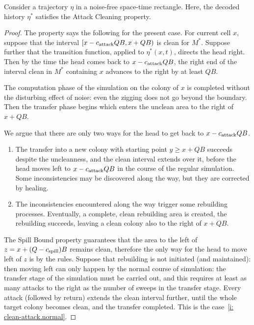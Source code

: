 \documentclass[12pt]{memoir}
\renewcommand{\ge}{\geq}
\def\B{B}
\newcommand{\Q}{Q}
\newcommand{\cns}[1]{c_{\textrm{\upshape #1}}}
\newcommand{\CAtt}{\cns{attack}}
\newcommand{\CSpill}{\cns{spill}}
\begin{document}
\begin{lemma}\label{lem:clean-attack}
Consider a trajectory \( \eta \) in a noise-free space-time rectangle.
Here, the decoded history \( \eta^{*} \) satisfies the Attack Cleaning property.
\end{lemma}
\begin{proof}
The property says the following for the present case.
For current cell \( x \), suppose that the interval
\( \lint{x-\CAtt\Q\B}{x+\Q\B} \) is clean for \( M^{*} \).
Suppose further that the transition function, applied to \( \eta^{*}(x,t) \), directs the head right.
Then by the time the head comes back to \( x-\CAtt\Q\B \), the right end of the interval clean in \( M^{*} \)
containing \( x \) advances to the right by at least \( \Q\B \).

The computation phase of the simulation on the colony of \( x \) is completed without the disturbing effect
of noise: even the zigging does not go beyond the boundary.
Then the transfer phase begins which enters the unclean area to the right of \( x+\Q\B \).

We argue that there are only two ways for the head to get back to \( x-\CAtt\Q\B \).
\begin{enumerate}[label=(a\arabic*),ref=a\arabic*]
\item\label{i: clean-attack.normal} The transfer into a new colony with starting point
\( y\ge x+\Q\B \) succeeds despite the uncleanness, and the clean interval extends over it, before
the head moves left to \( x-\CAtt\Q\B \) in the course of the regular simulation.
Some inconsistencies may be discovered along the way, but they are corrected by healing.

\item\label{i: clean-attack.rebuild} The inconsistencies encountered along the way trigger some
rebuilding processes.
Eventually, a complete, clean rebuilding area is created, the rebuilding succeeds, leaving a clean
colony also to the right of \( x+\Q\B \).
\end{enumerate}

The Spill Bound property guarantees that the area to the left of \( z=x+(\Q-\CSpill)\B \) remains clean,
therefore the only way for the head to move left of \( z \) is by the rules.
Suppose that rebuilding is not initiated (and maintained): then moving left can only happen by the normal
course of simulation: the transfer stage of the simulation must be carried out, and this requires 
at least as many attacks to the right as the number of sweeps in the transfer stage.
Every attack (followed by return) extends the clean interval further, until the whole target colony becomes clean,
and the transfer completed.
This is the case~\eqref{i: clean-attack.normal}.


\end{proof}
\end{document}
